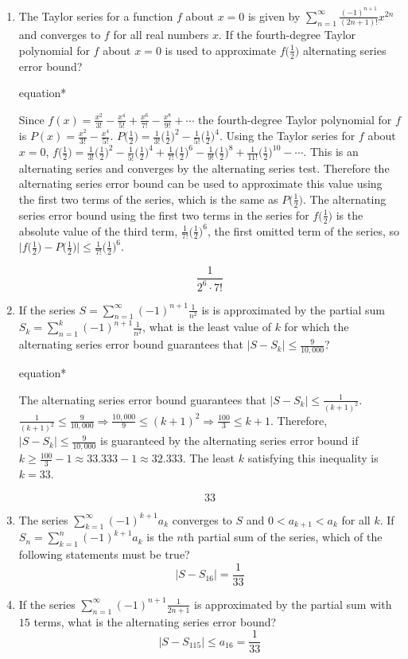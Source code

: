 \documentclass[12pt]{article}
\begin{document}
\begin{enumerate}
	          
	\item The Taylor series for a function $f$ about $x = 0$ is given by $\sum_{n=1}^{\infty} \frac{(-1)^{n+1}}{(2n+1)!} x^{2n}$ and converges to $f$ for all real numbers $x$. If the fourth-degree Taylor polynomial for $f$ about $x = 0$ is used to approximate $f\big(\frac{1}{2}\big)$ alternating series error bound?
	      \begin{empheq}[box=\tcbhighmath]{equation*}
	      	\parbox{6in}{Since $f(x)=\frac{x^2}{3!} - \frac{x^4}{5!} +  \frac{x^6}{7!} - \frac{x^8}{9!} + \cdots$ the fourth-degree Taylor polynomial for $f$ is $P(x)= \frac{x^2}{3!} - \frac{x^4}{5!}$. $P\big(\frac{1}{2}\big)=\frac{1}{3!}\big(\frac{1}{2})^2 - \frac{1}{5!}\big(\frac{1}{2})^4$. Using the Taylor series for $f$ about $x = 0$, $f\big(\frac{1}{2}\big) = \frac{1}{3!}\big(\frac{1}{2})^2 - \frac{1}{5!}\big(\frac{1}{2})^4 + \frac{1}{7!}\big(\frac{1}{2})^6 - \frac{1}{9!}\big(\frac{1}{2})^8 + \frac{1}{11!}\big(\frac{1}{2})^{10} - \cdots$. This is an alternating series and converges by the alternating series test. Therefore the alternating series error bound can be used to approximate this value using the first two terms of the series, which is the same as $P\big(\frac{1}{2}\big)$. The alternating series error bound using the first two terms in the series for $f\big(\frac{1}{2}\big)$ is the absolute value of the third term, $\frac{1}{7!}\big(\frac{1}{2})^6$, the first omitted term of the series, so $\bigg|f\big(\frac{1}{2}\big) - P\big(\frac{1}{2}\big) \bigg| \leq \frac{1}{7!}\big(\frac{1}{2}\big)^6$.}
	      \end{empheq}
	      $$\boxed{\frac{1}{2^6 \cdot7!}}$$
	\item If the series $S=\sum_{n=1}^{\infty} (-1)^{n+1} \frac{1}{n^2}$ is is approximated by the partial sum $S_k = \sum_{n=1}^{k} (-1)^{n+1} \frac{1}{n^2}$, what is the least value of $k$ for which the alternating series error bound guarantees that $|S-S_k| \leq \frac{9}{10,000}$?
	      \begin{empheq}[box=\tcbhighmath]{equation*}
	      	\parbox{6in}{The alternating series error bound guarantees that $|S-S_k|\leq \frac{1}{(k+1)^2}$. $\frac{1}{(k+1)^2} \leq \frac{9}{10,000} \Longrightarrow \frac{10,000}{9} \leq (k+1)^2 \Longrightarrow \frac{100}{3} \leq k+1$. Therefore, $|S-S_k| \leq \frac{9}{10,000}$ is guaranteed by the alternating series error bound if $k\geq \frac{100}{3}-1 \approx 33.333 - 1 \approx 32.333$. The least $k$ satisfying this inequality is $k=33$.}
	      \end{empheq}
	      $$\boxed{33}$$
	\item The series $\sum_{k=1}^{\infty} (-1)^{k+1}a_k$ converges to $S$ and $0 < a_{k+1} < a_k$ for all $k$. If $S_n = \sum_{k=1}^{n}(-1)^{k+1}a_k$ is the $n$th partial sum of the series, which of the following statements must be true?
	      $$\boxed{\Big|S-S_{16}\Big| = \frac{1}{33}}$$
	\item If the series $\sum_{n=1}^{\infty}(-1)^{n+1} \frac{1}{2n+1}$ is approximated by the partial sum with $15$ terms, what is the alternating series error bound?
	      $$\Big|S-S_{115}\Big| \leq a_{16} = \boxed{\frac{1}{33}}$$
\end{enumerate}
\end{document}

